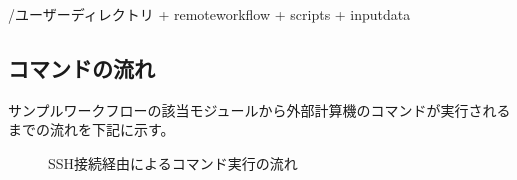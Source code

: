\documentclass[letterpaper,10pt,dvipdfmx,openany]{sphinxmanual}
\begin{document}
%
\begin{sphinxVerbatim}[commandchars=\\\{\}]
\PYGZti{}/ユーザーディレクトリ
  + remote\PYGZus{}workflow
    + scripts
      + input\PYGZus{}data
\end{sphinxVerbatim}


\subsection{コマンドの流れ}
\label{\detokenize{using_distributed_properties:id11}}
サンプルワークフローの該当モジュールから外部計算機のコマンドが実行されるまでの流れを下記に示す。

\begin{figure}[htbp]
\centering
\capstart
\caption{SSH接続経由によるコマンド実行の流れ}\label{\detokenize{using_distributed_properties:id45}}\end{figure}
\end{document}
